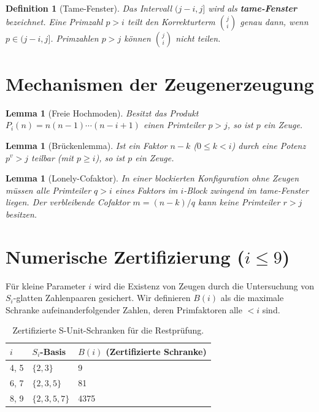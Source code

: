 \documentclass[12pt,a4paper]{article}
\newtheorem{lemma}[theorem]{Lemma}
\newtheorem{definition}[theorem]{Definition}
\begin{document}
	\begin{definition}[Tame-Fenster]
		Das Intervall $(j-i, j]$ wird als \textbf{tame-Fenster} bezeichnet. Eine Primzahl $p > i$ teilt den Korrekturterm $\binom{j}{i}$ genau dann, wenn $p \in (j-i, j]$. Primzahlen $p > j$ können $\binom{j}{i}$ nicht teilen.
	\end{definition}
	
	\section{Mechanismen der Zeugenerzeugung}
	
	\begin{lemma}[Freie Hochmoden]
		Besitzt das Produkt $P_i(n) = n(n-1)\cdots(n-i+1)$ einen Primteiler $p > j$, so ist $p$ ein Zeuge.
	\end{lemma}
	
	\begin{lemma}[Brückenlemma]
		Ist ein Faktor $n-k$ ($0 \le k < i$) durch eine Potenz $p^v > j$ teilbar (mit $p \ge i$), so ist $p$ ein Zeuge.
	\end{lemma}
	
	\begin{lemma}[Lonely-Cofaktor]
		In einer blockierten Konfiguration ohne Zeugen müssen alle Primteiler $q > i$ eines Faktors im $i$-Block zwingend im tame-Fenster liegen. Der verbleibende Cofaktor $m = (n-k)/q$ kann keine Primteiler $r > j$ besitzen.
	\end{lemma}
	
	\section{Numerische Zertifizierung ($i \le 9$)}
	Für kleine Parameter $i$ wird die Existenz von Zeugen durch die Untersuchung von $S_i$-glatten Zahlenpaaren gesichert. Wir definieren $B(i)$ als die maximale Schranke aufeinanderfolgender Zahlen, deren Primfaktoren alle $< i$ sind.
	
	\begin{table}[h]
		\centering
		\begin{tabular}{@{}lll@{}}
			\toprule
			$i$ & $S_i$-Basis & $B(i)$ (Zertifizierte Schranke) \\ \midrule
			4, 5 & $\{2, 3\}$ & 9 \\
			6, 7 & $\{2, 3, 5\}$ & 81 \\
			8, 9 & $\{2, 3, 5, 7\}$ & 4375 \\ \bottomrule
		\end{tabular}
		\caption{Zertifizierte S-Unit-Schranken für die Restprüfung.}
	\end{table}
	
\end{document}
